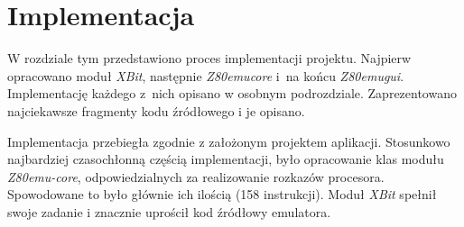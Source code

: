 \chapter{Implementacja}
    W rozdziale tym przedstawiono proces implementacji projektu. Najpierw opracowano moduł \emph{XBit}, następnie \emph{Z80emu{\dywiz}core} i~na końcu \emph{Z80emu{\dywiz}gui}. Implementację każdego z~nich opisano w osobnym podrozdziale. Zaprezentowano najciekawsze fragmenty kodu źródłowego i je opisano. 

	
	
	
	
	Implementacja przebiegła zgodnie z założonym projektem aplikacji. Stosunkowo najbardziej czasochłonną częścią implementacji, było opracowanie klas modułu \emph{Z80emu-core}, odpowiedzialnych za realizowanie rozkazów procesora. Spowodowane to było głównie ich ilością (158 instrukcji). Moduł \emph{XBit} spełnił swoje zadanie i znacznie uprościł kod źródłowy emulatora. 
	
	
	
	